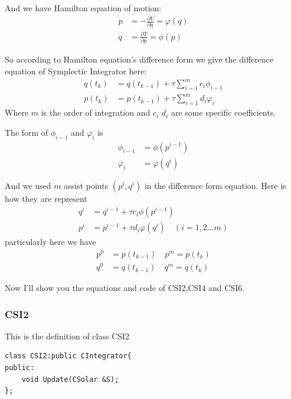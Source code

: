 \documentclass[12pt]{article}
\begin{document}
And we have Hamilton equation of motion:
\begin{equation}
\begin{aligned}
\dot{p}&=-\frac{\partial V}{\partial q} =\varphi (q)\\
\dot{q}&=\frac{\partial T}{\partial p} =\phi (p)
\end{aligned}
\end{equation}


So according to Hamilton equation's difference form we give the difference equation of 
Symplectic Integrator here:
\begin{equation}
\begin{aligned}
q(t_{k}) &= q(t_{k-1}) +\tau\sum_{i=1}^{m}c_{i}\phi_{i-1} \\
p(t_{k}) &= p(t_{k-1}) +\tau\sum_{i=1}^{m}d_{i}\varphi_{i}
\end{aligned}
\end{equation}
Where $m$ is the order of integration and $c_{i}$ $d_{i}$ are some specific coefficients.

The form of $\phi_{i-1}$ and $\varphi_{i}$ is
\begin{equation}
\begin{aligned}
\phi_{i-1}&=\phi (p^{i-1}) \\
\varphi_{i}&=\varphi (q^{i})
\end{aligned}
\end{equation}

And we used $m$ assist points $(p^i,q^i)$ in the difference form equation.
Here is how they are represent
\begin{equation}
\begin{aligned}
q^i &= q^{i-1} + \tau c_{i} \phi (p^{i-1}) \\ 
p^i &= p^{i-1} + \tau d_{i} \varphi (q^{i}) \quad (i=1,2\dots m)
\end{aligned}
\end{equation}
particularly here we have
\begin{equation}
\begin{aligned}
p^0 &= p(t_{k-1}) \quad p^m=p(t_{k}) \\ 
q^0 &= q(t_{k-1}) \quad q^m=q(t_{k}) 
\end{aligned}
\end{equation}

Now I'll show you the equations and code of CSI2,CSI4 and CSI6.

\clearpage
\subsubsection{CSI2}
This is the definition of class CSI2 
\begin{lstlisting}[caption=CSI2 class]
class CSI2:public CIntegrator{
public:
    void Update(CSolar &S);
};
\end{lstlisting}
\end{document}
